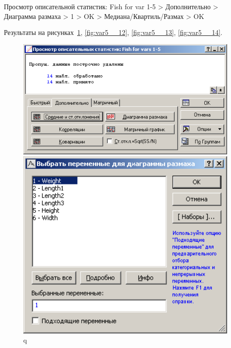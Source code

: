Просмотр описательной статистик: Fish for var 1-5
> Дополнительно > Диаграмма размаха > 1 > OK > Медиана/Квартиль/Размах > OK

Результаты на рисунках~\ref{fig:var5__11}, \ref{fig:var5__12}, \ref{fig:var5__13}, \ref{fig:var5__14}.

\begin{figure}[!h]
  \centering
  \begin{minipage}{0.32\textwidth}
    \centering

    \includegraphics[width=0.99\textwidth]
    {inc/var5__11.PNG}

    \caption{q}
    \label{fig:var5__11}
  \end{minipage}
  \begin{minipage}{0.32\textwidth}
    \centering

    \includegraphics[width=0.99\textwidth]
    {inc/var5__12.PNG}


\end{minipage}
\end{figure}
